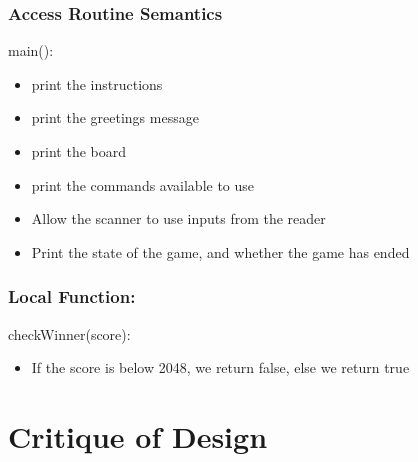 \documentclass[12pt]{article}
\begin{document}
\subsubsection* {Access Routine Semantics}

\noindent main():
\begin{itemize}
  \item print the instructions
  \item print the greetings message
  \item print the board
  \item print the commands available to use
  \item Allow the scanner to use inputs from the reader
  \item Print the state of the game, and whether the game has ended
\end{itemize}

\subsubsection*{Local Function:}

\noindent checkWinner(score):
\begin{itemize}
  \item If the score is below 2048, we return false, else we return true
\end{itemize}

\newpage

\section*{Critique of Design}
\end{document}
